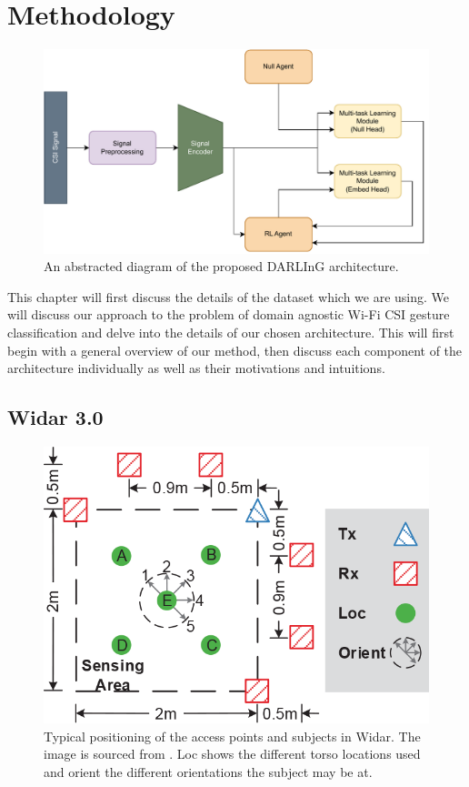 \chapter{Methodology}\label{chapter:methodology}

\begin{figure}
	\centering
	\includegraphics[width=\linewidth]{figures/arch_diagram.pdf}
	\caption{An abstracted diagram of the proposed DARLInG architecture.}
	\label{fig:arch-diagram}
\end{figure}

This chapter will first discuss the details of the dataset which we are using. 
We will discuss our approach to the problem of domain agnostic Wi-Fi CSI gesture classification and delve into the details of our chosen architecture.
This will first begin with a general overview of our method, then discuss each component of the architecture individually as well as their motivations and intuitions.

\section{Widar 3.0}

\begin{figure}
	\centering
	\includegraphics{figures/widar-positioning}
	\caption{Typical positioning of the access points and subjects in Widar. The image is sourced from \cite{zheng2019zero}. Loc shows the different torso locations used and orient the different orientations the subject may be at.}
	\label{fig:widar-positioning}
\end{figure}

